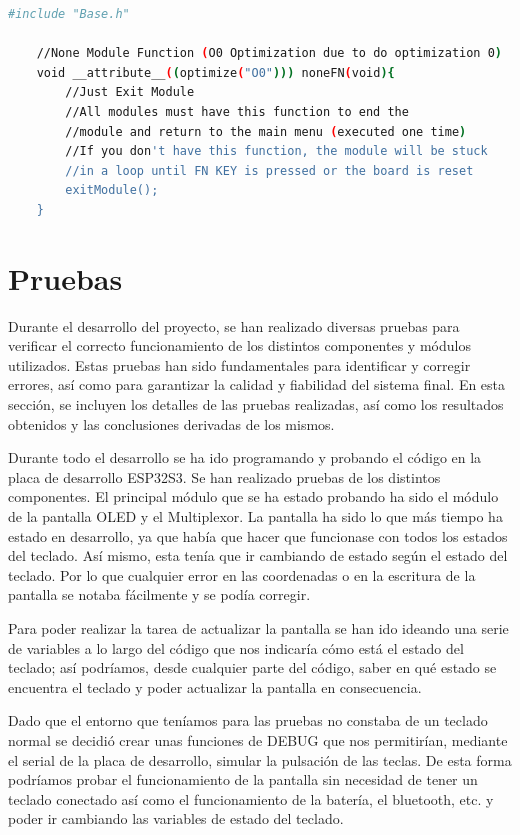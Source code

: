 \begin{lstlisting}[style=console, language=bash, caption={La función base vacía que no hace nada a forma de ejemplo. En base.h y base.cpp}, label={code:BaseFuncion}]
    #include "Base.h"

    //None Module Function (O0 Optimization due to do optimization 0)
    void __attribute__((optimize("O0"))) noneFN(void){
        //Just Exit Module
        //All modules must have this function to end the
        //module and return to the main menu (executed one time)
        //If you don't have this function, the module will be stuck 
        //in a loop until FN KEY is pressed or the board is reset
        exitModule();
    }
\end{lstlisting}

\section{Pruebas}\label{ApendicePruebas}
Durante el desarrollo del proyecto, se han realizado diversas pruebas para verificar el correcto funcionamiento de los distintos componentes y módulos utilizados. Estas pruebas han sido fundamentales para identificar y corregir errores, así como para garantizar la calidad y fiabilidad del sistema final. En esta sección, se incluyen los detalles de las pruebas realizadas, así como los resultados obtenidos y las conclusiones derivadas de los mismos.

Durante todo el desarrollo se ha ido programando y probando el código en la placa de desarrollo ESP32S3. Se han realizado pruebas de los distintos componentes. El principal módulo que se ha estado probando ha sido el módulo de la pantalla \gls{OLED} y el Multiplexor. La pantalla ha sido lo que más tiempo ha estado en desarrollo, ya que había que hacer que funcionase con todos los estados del teclado. Así mismo, esta tenía que ir cambiando de estado según el estado del teclado. Por lo que cualquier error en las coordenadas o en la escritura de la pantalla se notaba fácilmente y se podía corregir.

Para poder realizar la tarea de actualizar la pantalla se han ido ideando una serie de variables a lo largo del código que nos indicaría cómo está el estado del teclado; así podríamos, desde cualquier parte del código, saber en qué estado se encuentra el teclado y poder actualizar la pantalla en consecuencia.

Dado que el entorno que teníamos para las pruebas no constaba de un teclado normal se decidió crear unas funciones de \gls{DEBUG} que nos permitirían, mediante el serial de la placa de desarrollo, simular la pulsación de las teclas. De esta forma podríamos probar el funcionamiento de la pantalla sin necesidad de tener un teclado conectado así como el funcionamiento de la batería, el bluetooth, etc. y poder ir cambiando las variables de estado del teclado.

